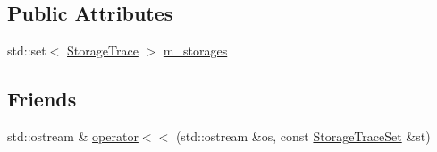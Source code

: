 \subsection*{Public Attributes}
\begin{DoxyCompactItemize}
\item 
std\+::set$<$ \hyperlink{class_simulator_1_1_storage_trace}{Storage\+Trace} $>$ \hyperlink{class_simulator_1_1_storage_trace_set_a0b59a3997cd0df29e14d163f300613d8}{m\+\_\+storages}
\end{DoxyCompactItemize}
\subsection*{Friends}
\begin{DoxyCompactItemize}
\item 
std\+::ostream \& \hyperlink{class_simulator_1_1_storage_trace_set_a3abe52c008bd83f152a3f6e7327e1914}{operator$<$$<$} (std\+::ostream \&os, const \hyperlink{class_simulator_1_1_storage_trace_set}{Storage\+Trace\+Set} \&st)
\end{DoxyCompactItemize}


